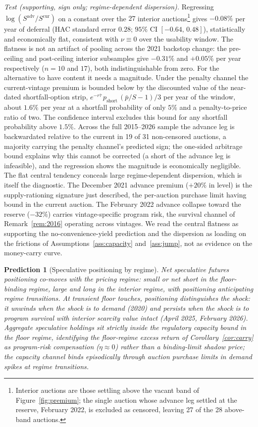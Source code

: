 \documentclass[11pt,letterpaper]{article}
\theoremstyle{plain}
\newtheorem{prediction}{Prediction}[section]
\theoremstyle{definition}
\numberwithin{equation}{section}
\begin{document}
\emph{Test (supporting, sign only; regime-dependent dispersion).} Regressing $\log(S^{\mathrm{adv}}/S^{\mathrm{cur}})$ on a constant over the $27$ interior auctions\footnote{Interior auctions are those settling above the vacant band of Figure~\ref{fig:premium}; the single auction whose advance leg settled at the reserve, February 2022, is excluded as censored, leaving 27 of the 28 above-band auctions.} gives $-0.08\%$ per year of deferral (HAC standard error $0.28$; $95\%$ CI $[-0.64,\,0.48]$), statistically and economically flat, consistent with $\nu\equiv0$ over the usability window. The flatness is not an artifact of pooling across the 2021 backstop change: the pre-ceiling and post-ceiling interior subsamples give $-0.31\%$ and $+0.05\%$ per year respectively ($n=10$ and $17$), both indistinguishable from zero. For the alternative to have content it needs a magnitude. Under the penalty channel the current-vintage premium is bounded below by the discounted value of the near-dated shortfall-option strip, $e^{-r\bar\tau}\,p_{\mathrm{short}}\,(\bar p/S-1)/3$ per year of the window, about $1.6\%$ per year at a shortfall probability of only $5\%$ and a penalty-to-price ratio of two. The confidence interval excludes this bound for any shortfall probability above $1.5\%$. Across the full 2015--2026 sample the advance leg is backwardated relative to the current in 19 of 31 non-censored auctions, a majority carrying the penalty channel's predicted sign; the one-sided arbitrage bound explains why this cannot be corrected (a short of the advance leg is infeasible), and the regression shows the magnitude is economically negligible. The flat central tendency conceals large regime-dependent dispersion, which is itself the diagnostic. The December 2021 advance premium ($+20\%$ in level) is the supply-rationing signature just described, the per-auction purchase limit having bound in the current auction. The February 2022 advance collapse toward the reserve ($-32\%$) carries vintage-specific program risk, the survival channel of Remark~\ref{rem:2016} operating across vintages. We read the central flatness as supporting the no-convenience-yield prediction and the dispersion as loading on the frictions of Assumptions~\ref{ass:capacity} and~\ref{ass:jump}, not as evidence on the money-carry curve.

\begin{prediction}[Speculative positioning by regime]\label{pred:positions}
Net speculative futures positioning co-moves with the pricing regime: small or net short in the floor-binding regime, large and long in the interior regime, with positioning anticipating regime transitions. At transient floor touches, positioning distinguishes the shock: it unwinds when the shock is to demand (2020) and persists when the shock is to program survival with interior scarcity value intact (April 2025, February 2026). Aggregate speculative holdings sit strictly inside the regulatory capacity bound in the floor regime, identifying the floor-regime excess return of Corollary~\ref{cor:carry} as program-risk compensation ($\eta\approx 0$) rather than a binding-limit shadow price; the capacity channel binds episodically through auction purchase limits in demand spikes at regime transitions.
\end{prediction}
\end{document}
